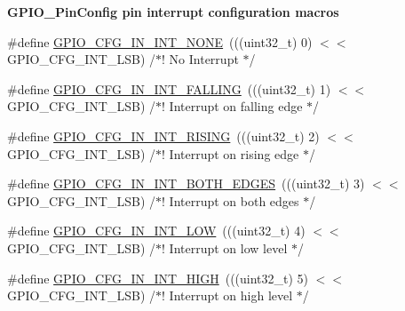 \begin{Indent}{\bf G\+P\+I\+O\+\_\+\+Pin\+Config pin interrupt configuration macros}\par
\begin{DoxyCompactItemize}
\item 
\#define \hyperlink{_g_p_i_o_8h_a666c6995ed5737b43a707d1cacd9fe69}{G\+P\+I\+O\+\_\+\+C\+F\+G\+\_\+\+I\+N\+\_\+\+I\+N\+T\+\_\+\+N\+O\+N\+E}~(((uint32\+\_\+t) 0) $<$$<$ G\+P\+I\+O\+\_\+\+C\+F\+G\+\_\+\+I\+N\+T\+\_\+\+L\+S\+B)    /$\ast$! No Interrupt $\ast$/
\item 
\#define \hyperlink{_g_p_i_o_8h_a7a69ee26049dc2f8b5059b00a24b9f74}{G\+P\+I\+O\+\_\+\+C\+F\+G\+\_\+\+I\+N\+\_\+\+I\+N\+T\+\_\+\+F\+A\+L\+L\+I\+N\+G}~(((uint32\+\_\+t) 1) $<$$<$ G\+P\+I\+O\+\_\+\+C\+F\+G\+\_\+\+I\+N\+T\+\_\+\+L\+S\+B)    /$\ast$! Interrupt on falling edge $\ast$/
\item 
\#define \hyperlink{_g_p_i_o_8h_a4a9f53e525d1f1659b485274d08ff91f}{G\+P\+I\+O\+\_\+\+C\+F\+G\+\_\+\+I\+N\+\_\+\+I\+N\+T\+\_\+\+R\+I\+S\+I\+N\+G}~(((uint32\+\_\+t) 2) $<$$<$ G\+P\+I\+O\+\_\+\+C\+F\+G\+\_\+\+I\+N\+T\+\_\+\+L\+S\+B)    /$\ast$! Interrupt on rising edge $\ast$/
\item 
\#define \hyperlink{_g_p_i_o_8h_a0829900a2dd949219edc6ddc8d928f3c}{G\+P\+I\+O\+\_\+\+C\+F\+G\+\_\+\+I\+N\+\_\+\+I\+N\+T\+\_\+\+B\+O\+T\+H\+\_\+\+E\+D\+G\+E\+S}~(((uint32\+\_\+t) 3) $<$$<$ G\+P\+I\+O\+\_\+\+C\+F\+G\+\_\+\+I\+N\+T\+\_\+\+L\+S\+B)    /$\ast$! Interrupt on both edges $\ast$/
\item 
\#define \hyperlink{_g_p_i_o_8h_ab0f05c331bb66230f175e574d0d317a6}{G\+P\+I\+O\+\_\+\+C\+F\+G\+\_\+\+I\+N\+\_\+\+I\+N\+T\+\_\+\+L\+O\+W}~(((uint32\+\_\+t) 4) $<$$<$ G\+P\+I\+O\+\_\+\+C\+F\+G\+\_\+\+I\+N\+T\+\_\+\+L\+S\+B)    /$\ast$! Interrupt on low level $\ast$/
\item 
\#define \hyperlink{_g_p_i_o_8h_a669d2e840e0f934426670a069a5efe0e}{G\+P\+I\+O\+\_\+\+C\+F\+G\+\_\+\+I\+N\+\_\+\+I\+N\+T\+\_\+\+H\+I\+G\+H}~(((uint32\+\_\+t) 5) $<$$<$ G\+P\+I\+O\+\_\+\+C\+F\+G\+\_\+\+I\+N\+T\+\_\+\+L\+S\+B)    /$\ast$! Interrupt on high level $\ast$/
\end{DoxyCompactItemize}
\end{Indent}

